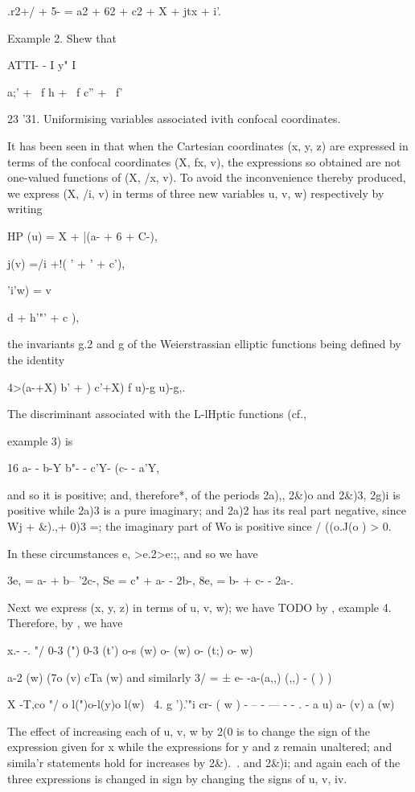 {{.r2+/ + 5- = a2 + 62 + c2 + X + jtx + i'.

Example 2. Shew that

ATTI- - I y" I

   a;' + \ f h + \ f c'' + \ f'

23 '31. Uniformising variables associated ivith confocal coordinates.

It has been seen in  that when the Cartesian coordinates (x, y,
z) are expressed in terms of the confocal coordinates (X, fx, v), the
expressions so obtained are not one-valued functions of (X, /x, v). To
avoid the inconvenience thereby produced, we express (X, /i, v) in
terms of three new variables u, v, w) respectively by writing

HP (u) = X + |(a- + 6 + C-),

 j(v) =/i +!( ' + ' + c'),

'i'w) = v \ \ {d + h'"' + c ),

the invariants g.2 and g of the Weierstrassian elliptic functions
being defined by the identity

4>(a-+X) b' + ) c'+X) f u)-g u)-g,.

%
%

The discriminant associated with the L-lHptic functions (cf.,

example 3) is

16 a- - b-Y b"- - c'Y- (c- - a'Y,

and so it is positive; and, therefore*, of the periods 2a),, 2\&)o
and 2\&)3, 2g)i is positive while 2a)3 is a pure imaginary; and 2a)2
has its real part negative, since Wj + \&).,+ 0)3 =; the imaginary
part of Wo is positive since / ((o.J(o ) > 0.

In these circumstances e, >e.2>e:;, and so we have

3e, = a- + b-- '2c-, Se = c" + a- - 2b-, 8e, = b- + c- - 2a-.

Next we express (x, y, z) in terms of u, v, w); we have
TODO
by , example 4. Therefore, by , we have

x.- -. "/ 0-3 (") 0-3 (t') o-s (w) o- (w) o- (t;) o- w)

a-2 (w) (7o (v) cTa (w) and similarly 3/ = ± e- -a-(a,,) (,,) - ( ) )

X -T,co "/ o l(")o-l(y)o l(w) \ 4. g ').'"i cr- ( w ) - -- - --- - - .
- a u) a- (v) a (w)

The effect of increasing each of u, v, w by 2(0 is to change the sign
of the expression given for x while the expressions for y and z remain
unaltered; and simila'r statements hold for increases by 2\&).\ . and
2\&)i; and again each of the three expressions is changed in sign by
changing the signs of u, v, iv.

}}}
